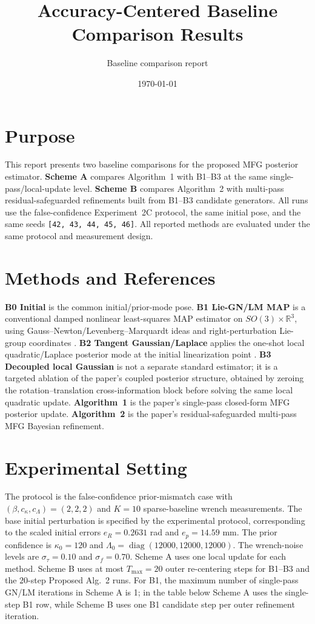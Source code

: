 \documentclass[11pt]{article}
\title{Accuracy-Centered Baseline Comparison Results}
\author{Baseline comparison report}
\date{\today}
\begin{document}
\maketitle

\section*{Purpose}
This report presents two baseline comparisons for the proposed MFG posterior
estimator.  \textbf{Scheme A} compares Algorithm~1 with B1--B3 at the same
single-pass/local-update level.  \textbf{Scheme B} compares Algorithm~2 with
multi-pass residual-safeguarded refinements built from B1--B3 candidate
generators.  All runs use the false-confidence Experiment~2C protocol,
the same initial pose, and the same seeds \texttt{[42, 43, 44, 45, 46]}.  All reported
methods are evaluated under the same protocol and measurement design.

\section*{Methods and References}
\textbf{B0 Initial} is the common initial/prior-mode pose.  \textbf{B1
Lie-GN/LM MAP} is a conventional damped nonlinear least-squares MAP estimator
on $SO(3)\times\mathbb R^3$, using Gauss--Newton/Levenberg--Marquardt ideas
\cite{Levenberg1944,Marquardt1963,NocedalWright2006} and right-perturbation
Lie-group coordinates \cite{Barfoot2017}.  \textbf{B2 Tangent
Gaussian/Laplace} applies the one-shot local quadratic/Laplace posterior mode
at the initial linearization point \cite{TierneyKadane1986,Barfoot2017}.
\textbf{B3 Decoupled local Gaussian} is not a separate standard estimator; it
is a targeted ablation of the paper's coupled posterior structure, obtained by
zeroing the rotation--translation cross-information block before solving the
same local quadratic update.  \textbf{Algorithm~1} is the paper's single-pass
closed-form MFG posterior update.  \textbf{Algorithm~2} is the paper's
residual-safeguarded multi-pass MFG Bayesian refinement.

\section*{Experimental Setting}
The protocol is the false-confidence prior-mismatch case with
$(\beta,c_\kappa,c_\Lambda)=(2,2,2)$ and $K=10$ sparse-baseline wrench
measurements.  The base initial perturbation is specified by the experimental
protocol, corresponding to the scaled initial errors
$e_R=0.2631$ rad and $e_p=14.59$ mm.  The prior confidence is
$\kappa_0=120$ and $\Lambda_0=\operatorname{diag}(12000,12000,12000)$.
The wrench-noise levels are $\sigma_\tau=0.10$ and $\sigma_f=0.70$.  Scheme A
uses one local update for each method.  Scheme B uses at most $T_{\max}=20$
outer re-centering steps for B1--B3 and the $20$-step Proposed Alg.~2
runs.  For B1, the maximum number of single-pass GN/LM iterations in Scheme A
is 1; in the table below Scheme A uses the single-step B1 row, while
Scheme B uses one B1 candidate step per outer refinement iteration.
\end{document}
